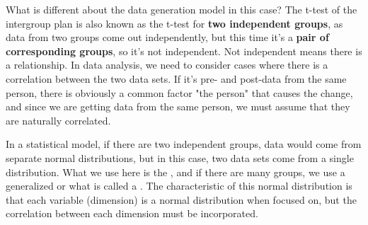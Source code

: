 \documentclass{ltjsbook}
\begin{document}
What is different about the data generation model in this case? The t-test of the intergroup plan is also known as the t-test for \textbf{two independent groups}, as data from two groups come out independently, but this time it's a \textbf{pair of corresponding groups}, so it's not independent. Not independent means there is a relationship. In data analysis, we need to consider cases where there is a correlation between the two data sets. If it's pre- and post-data from the same person, there is obviously a common factor "the person" that causes the change, and since we are getting data from the same person, we must assume that they are naturally correlated.

In a statistical model, if there are two independent groups, data would come from separate normal distributions, but in this case, two data sets come from a single distribution. What we use here is the , and if there are many groups, we use a generalized  or what is called a . The characteristic of this normal distribution is that each variable (dimension) is a normal distribution when focused on, but the correlation between each dimension must be incorporated.
\end{document}
